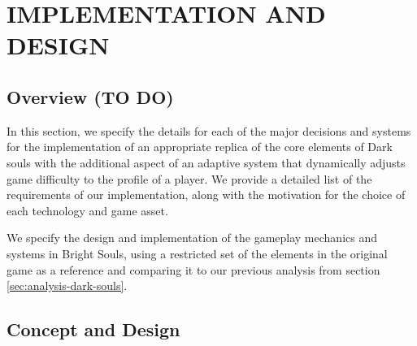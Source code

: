 \chapter{IMPLEMENTATION AND DESIGN}
\label{ch:implementation-design}




\section{Overview (TO DO)}

In this section, we specify the details for each of the major decisions and systems for the implementation of an appropriate replica of the core elements of Dark souls with the additional aspect of an adaptive system that dynamically adjusts game difficulty to the profile of a player. We provide a detailed list of the requirements of our implementation, along with the motivation for the choice of each technology and game asset.

We specify the design and implementation of the gameplay mechanics and systems in Bright Souls, using a restricted set of the elements in the original game as a reference and comparing it to our previous analysis from section \ref{sec:analysis-dark-souls}.





\section{Concept and Design}



